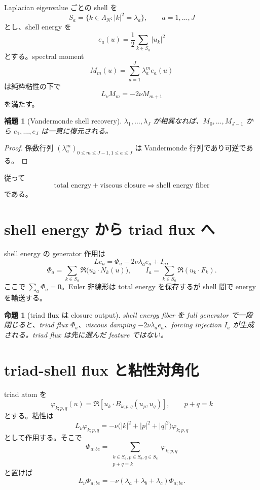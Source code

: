 \documentclass[11pt,a4paper,openany]{book}
\newtheorem{proposition}[definition]{命題}
\newtheorem{lemma}[definition]{補題}
\numberwithin{equation}{chapter}
\begin{document}
Laplacian eigenvalue ごとの shell を
\[
S_a=\{k\in\Lambda_N:|k|^2=\lambda_a\},
\qquad a=1,\ldots,J
\]
とし、shell energy を
\[
e_a(u)=\frac12\sum_{k\in S_a}|u_k|^2
\]
とする。spectral moment
\[
M_m(u)=\sum_{a=1}^J\lambda_a^m e_a(u)
\]
は純粋粘性の下で
\[
L_\nu M_m=-2\nu M_{m+1}
\]
を満たす。

\begin{lemma}[Vandermonde shell recovery]
$\lambda_1,\ldots,\lambda_J$ が相異なれば、$M_0,\ldots,M_{J-1}$ から $e_1,\ldots,e_J$ は一意に復元される。
\end{lemma}
\begin{proof}
係数行列 $(\lambda_a^m)_{0\le m\le J-1,1\le a\le J}$ は Vandermonde 行列であり可逆である。
\end{proof}

従って
\[
\boxed{\text{total energy}+\text{viscous closure}\Rightarrow\text{shell energy fiber}}
\]
である。

\section{shell energy から triad flux へ}
shell energy の generator 作用は
\begin{equation}
Le_a=\Phi_a-2\nu\lambda_a e_a+I_a,
\end{equation}
\begin{equation}
\Phi_a=\sum_{k\in S_a}\Re\bigl(u_k\cdot N_k(u)\bigr),
\qquad
I_a=\sum_{k\in S_a}\Re(u_k\cdot F_k).
\end{equation}
ここで $\sum_a\Phi_a=0$。Euler 非線形は total energy を保存するが shell 間で energy を輸送する。

\begin{proposition}[triad flux は closure output]
shell energy fiber を full generator で一段閉じると、triad flux $\Phi_a$、viscous damping $-2\nu\lambda_ae_a$、forcing injection $I_a$ が生成される。triad flux は先に選んだ feature ではない。
\end{proposition}

\section{triad-shell flux と粘性対角化}
triad atom を
\[
\varphi_{k;p,q}(u)
=\Re\left[u_k\cdot B_{k;p,q}(u_p,u_q)\right],
\qquad p+q=k
\]
とする。粘性は
\[
L_\nu\varphi_{k;p,q}
=-\nu\bigl(|k|^2+|p|^2+|q|^2\bigr)\varphi_{k;p,q}
\]
として作用する。そこで
\[
\Phi_{a;bc}
=\sum_{\substack{k\in S_a,p\in S_b,q\in S_c\\p+q=k}}
\varphi_{k;p,q}
\]
と置けば
\[
L_\nu\Phi_{a;bc}
=-\nu(\lambda_a+\lambda_b+\lambda_c)\Phi_{a;bc}.
\]
\end{document}
